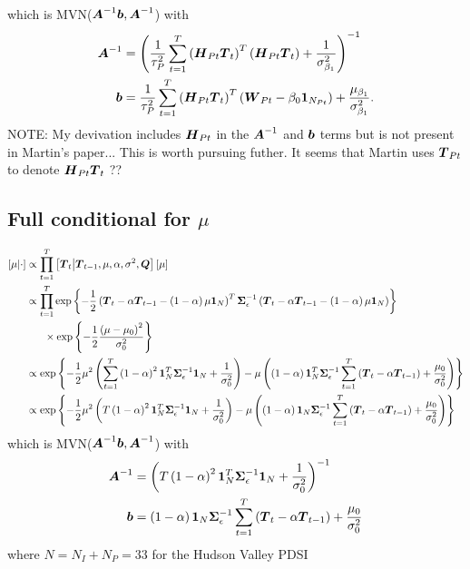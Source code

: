 \documentclass{article}\usepackage[]{graphicx}\usepackage[]{color}
\def\bm#1{\mbox{\boldmath $#1$}}
\begin{document}
which is MVN($\bm{A}^{ - 1}\bm{b}, \bm{A}^{ - 1}$) with
%
\begin{align*}
%
\bm{A}^{ - 1} & = \left( \frac{1} {\tau^2_P} \sum_{t = 1}^T \left( \bm{H}_{Pt} \bm{T}_t \right)^T \left( \bm{H}_{Pt} \bm{T}_t \right) + \frac{1} {\sigma^2_{\beta_1}} \right)^{ - 1}\\
%
\bm{b} & = \frac{1} {\tau^2_P} \sum_{t = 1}^T \left( \bm{H}_{Pt} \bm{T}_t \right)^T \left( \bm{W}_{Pt} - \beta_0 \bm{1}_{N_{Pt}} \right) + \frac{\mu_{\beta_1}} {\sigma^2_{\beta_1}}.\\
%
\end{align*}
%
NOTE: My devivation includes $\bm{H}_{Pt}$ in the $\bm{A}^{ - 1}$ and $\bm{b}$ terms but is not present in Martin's paper... This is worth pursuing futher. It seems that Martin uses $\bm{T}_{Pt}$ to denote $\bm{H}_{Pt} \bm{T}_t$ ??
%
%
\subsection{Full conditional for $\mu$}
%
\begin{align*}
%
\left[ \mu \middle| \cdot \right] & \propto \prod_{t = 1}^T \left[ \bm{T}_t \middle| \bm{T}_{t - 1}, \mu, \alpha, \sigma^2, \bm{Q} \right] \left[ \mu \right] \\
%
& \propto \prod_{t = 1}^T \exp{ \left\{ - \frac{1} {2} \left( \bm{T}_t  - \alpha \bm{T}_{t - 1} - \left( 1 - \alpha \right) \mu \bm{1}_N \right)^T \bm{\Sigma}_\epsilon^{ - 1} \left( \bm{T}_t  - \alpha \bm{T}_{t - 1} - \left( 1 - \alpha \right) \mu \bm{1}_N \right) \right\} }\\
& \hspace{6mm} \times \exp{ \left\{ - \frac{1} {2} \frac{\left( \mu - \mu_0 \right)^2} {\sigma^2_0} \right\} }\\
%
& \propto \exp{ \left\{ - \frac{1} {2} \mu^2 \left( \sum_{t = 1}^T \left( 1 - \alpha \right)^2 \bm{1}_N^T \bm{\Sigma}_\epsilon^{ - 1} \bm{1}_N + \frac{1} {\sigma^2_0} \right) - \mu \left( \left( 1 - \alpha \right) \bm{1}_N^T \bm{\Sigma}_\epsilon^{ - 1} \sum_{t = 1}^T \left( \bm{T}_t - \alpha \bm{T}_{t - 1} \right) + \frac{\mu_0} {\sigma^2_0} \right) \right\} }\\
%
& \propto \exp{ \left\{ - \frac{1} {2} \mu^2 \left( T \left( 1 - \alpha \right)^2 \bm{1}_N^T \bm{\Sigma}_\epsilon^{ - 1} \bm{1}_N + \frac{1} {\sigma^2_0} \right) - \mu \left( \left( 1 - \alpha \right) \bm{1}_N \bm{\Sigma}_\epsilon^{ - 1} \sum_{t = 1}^T \left( \bm{T}_t - \alpha \bm{T}_{t - 1} \right) + \frac{\mu_0} {\sigma^2_0} \right) \right\} }\\
%
\end{align*}
%
which is MVN($\bm{A}^{ - 1}\bm{b}, \bm{A}^{ - 1}$) with 
%
\begin{align*}
\bm{A}^{ - 1} & = \left( T \left( 1 - \alpha \right)^2 \bm{1}_N^T \bm{\Sigma}_\epsilon^{ - 1} \bm{1}_N + \frac{1} {\sigma^2_0} \right)^{ - 1}\\
%
\bm{b} & = \left( 1 - \alpha \right) \bm{1}_N \bm{\Sigma}_\epsilon^{ - 1} \sum_{t = 1}^T \left( \bm{T}_t - \alpha \bm{T}_{t - 1} \right) + \frac{\mu_0} {\sigma^2_0}\\
%
\end{align*}
%
where $N = N_I + N_P = 33$ for the Hudson Valley PDSI
%
%
\end{document}
